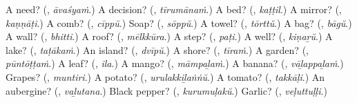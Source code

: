 \begin{tcolorbox}[breakable,colback=teal!4,colframe=teal!35!black,title={Before you move on}]
A need? (\textbf{}, \emph{āvaśyaṁ}.) A decision? (\textbf{}, \emph{tīrumānaṁ}.) A bed? (\textbf{}, \emph{kaṭṭil}.) A mirror? (\textbf{}, \emph{kaṇṇāṭi}.) A comb? (\textbf{}, \emph{cīppŭ}.) Soap? (\textbf{}, \emph{sōppŭ}.) A towel? (\textbf{}, \emph{tōrttŭ}.) A bag? (\textbf{}, \emph{bāgŭ}.) A wall? (\textbf{}, \emph{bhitti}.) A roof? (\textbf{}, \emph{mēlkkūra}.) A step? (\textbf{}, \emph{paṭi}.) A well? (\textbf{}, \emph{kiṇaṟŭ}.) A lake? (\textbf{}, \emph{taṭākaṁ}.) An island? (\textbf{}, \emph{dvīpŭ}.) A shore? (\textbf{}, \emph{tīraṁ}.) A garden? (\textbf{}, \emph{pūntōṭṭaṁ}.) A leaf? (\textbf{}, \emph{ila}.) A mango? (\textbf{}, \emph{māmpaḻaṁ}.) A banana? (\textbf{}, \emph{vāḻappaḻaṁ}.) Grapes? (\textbf{}, \emph{muntiri}.) A potato? (\textbf{}, \emph{urulakkiḻaṅṅŭ}.) A tomato? (\textbf{}, \emph{takkāḷi}.) An aubergine? (\textbf{}, \emph{vaḻutana}.) Black pepper? (\textbf{}, \emph{kurumuḷakŭ}.) Garlic? (\textbf{}, \emph{veḷuttuḷḷi}.)
\end{tcolorbox}
